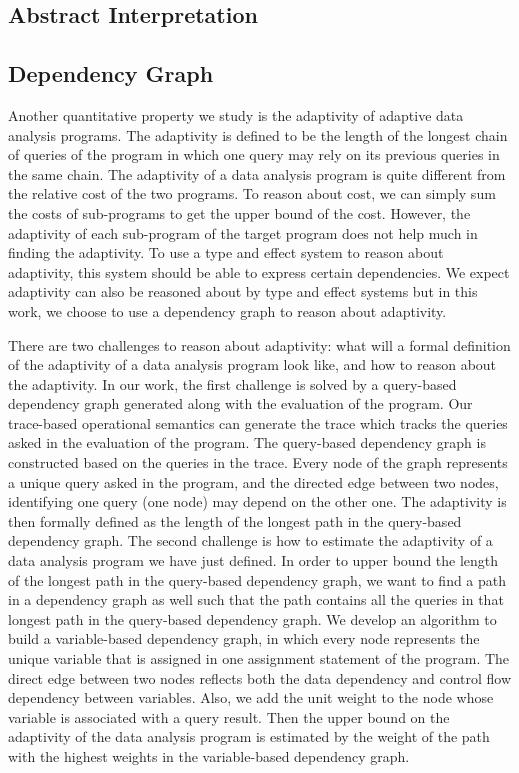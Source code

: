 \subsection{Abstract Interpretation}

\subsection{Dependency Graph}
Another quantitative property we study is the adaptivity of adaptive data analysis programs. 
{The adaptivity is defined to be the length of the longest chain of queries of the program in which one query may rely 
on its previous queries in the same chain. 
The adaptivity of a data analysis program is quite different from the relative cost of the two programs. To reason about cost, we can simply sum the costs of sub-programs to get the upper bound of the cost. However, the adaptivity of each sub-program of the target program does not help much in finding the adaptivity. To use a type and effect system to reason about adaptivity, this system should be able to express certain dependencies.
We expect adaptivity can also be reasoned about by type and effect systems but in this work, we choose to use a dependency graph to reason about adaptivity.}

{There are two challenges to reason about adaptivity: what will a formal definition of the adaptivity of a data analysis program look like, and how to reason about the adaptivity. 
In our work, the first challenge is solved by a query-based dependency graph generated along with the evaluation of the program. 
Our trace-based operational semantics can generate the trace which tracks the queries asked in the evaluation of the program. 
The query-based dependency graph is constructed based on the queries in the trace. Every node of the graph represents a unique query asked in the program, and the directed edge between two nodes, identifying one query (one node) may depend on the other one. 
The adaptivity is then formally defined as the length of the longest path in the query-based dependency graph.}
{The second challenge is how to estimate the adaptivity of a data analysis program we have just defined. 
In order to upper bound the length of the longest path in the query-based dependency graph, we want to find a path in a dependency graph as well such that the path contains all the queries in that longest path in the query-based dependency graph. 
We develop an algorithm to build a variable-based dependency graph, in which every node represents the unique variable that is assigned in one assignment statement of the program. 
The direct edge between two nodes reflects both the data dependency and control flow dependency between variables. Also, we add the unit weight to the node whose variable is associated with a query result. Then the upper bound on the adaptivity of the data analysis program is estimated by the weight of the path with the highest weights in the variable-based dependency graph.}

